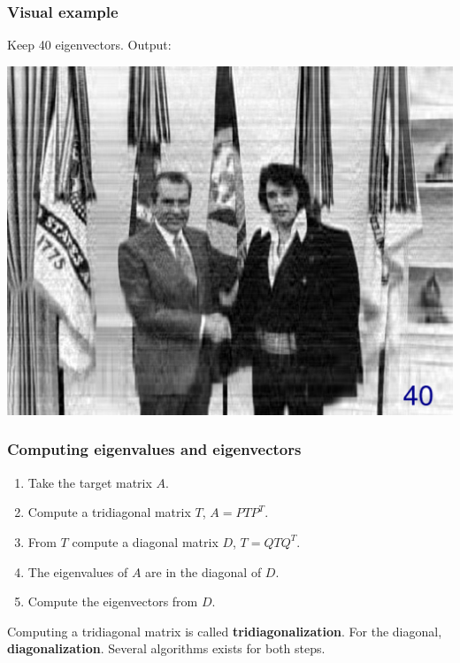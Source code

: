 \documentclass[serif, 12pt]{beamer}
\begin{document}

\begin{frame}

\frametitle{Visual example}
Keep 40 eigenvectors. Output:

\begin{center}
\includegraphics[width=\textheight]{out-40}
\end{center}

\end{frame}


\begin{frame}

\frametitle{Computing eigenvalues and eigenvectors}

\begin{enumerate}
\item Take the target matrix $A$.
\item Compute a tridiagonal matrix $T$, $A = PTP^T$.
\item From $T$ compute a diagonal matrix $D$, $T = QTQ^T$.
\item The eigenvalues of $A$ are in the diagonal of $D$.
\item Compute the eigenvectors from $D$.
\end{enumerate}

\pause

Computing a tridiagonal matrix is called \textbf{tridiagonalization}. For the 
diagonal, \textbf{diagonalization}. Several algorithms exists for both steps.

\end{frame}
\end{document}
